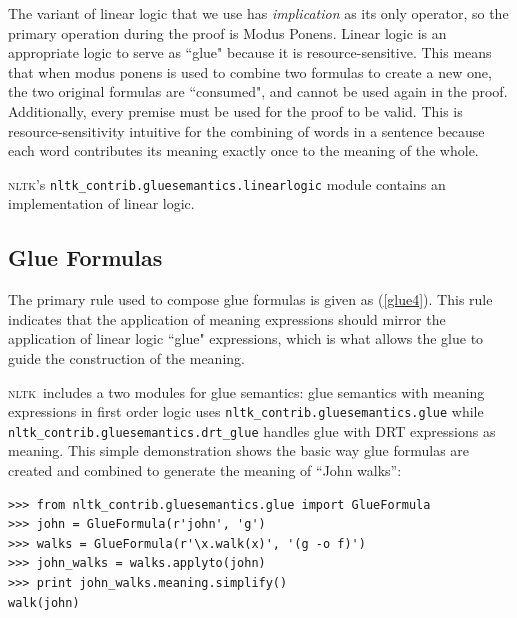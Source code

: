\documentclass[11pt,a4paper]{article}
\newcommand{\NLTK}{\textsc{nltk}}
\newcommand{\dhgcode}[1]{{\tt #1}}
\begin{document}
The variant of linear logic that we use has \emph{implication} as its
only operator, so the primary operation during the proof is Modus
Ponens.  Linear logic is an appropriate logic to serve as ``glue"
because it is resource-sensitive.  This means that when modus ponens
is used to combine two formulas to create a new one, the two original
formulas are ``consumed", and cannot be used again in the proof.
Additionally, every premise must be used for the proof to be valid.
This is resource-sensitivity intuitive for the combining of words in a
sentence because each word contributes its meaning exactly once to the
meaning of the whole. 


\NLTK's \dhgcode{nltk\_contrib.gluesemantics.linearlogic} module
contains an implementation of linear logic. 

\subsection{Glue Formulas}
The primary rule used to compose glue formulas is given as
(\ref{glue4}).  This rule indicates that the application of meaning
expressions should mirror the application of linear logic ``glue"
expressions, which is what allows the glue to guide the construction
of the meaning. 


\NLTK\ includes a two modules for glue semantics: glue semantics with
meaning expressions in first order logic uses
\dhgcode{nltk\_contrib.gluesemantics.glue} while
\dhgcode{nltk\_contrib.gluesemantics.drt\_glue} handles glue with DRT
expressions as meaning.  This simple demonstration shows the basic way
glue formulas are created and combined to generate the meaning of
``John walks'': 

\begin{verbatim}
>>> from nltk_contrib.gluesemantics.glue import GlueFormula
>>> john = GlueFormula(r'john', 'g')
>>> walks = GlueFormula(r'\x.walk(x)', '(g -o f)')
>>> john_walks = walks.applyto(john)
>>> print john_walks.meaning.simplify()
walk(john)
\end{verbatim}
\end{document}
